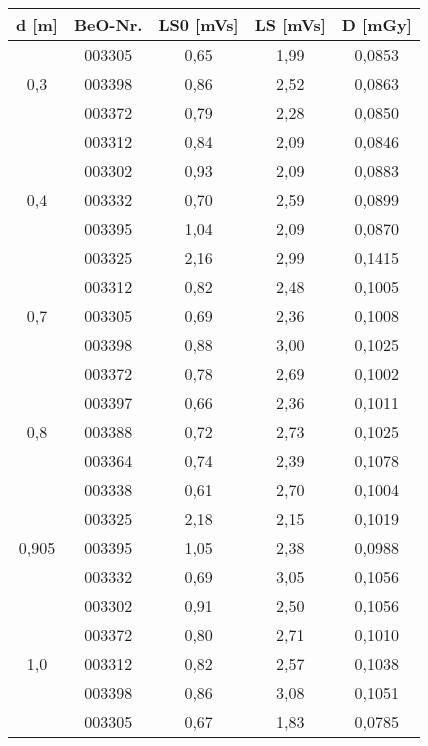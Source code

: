 	\begin{center}	
		\begin{tabular}{c|c|c|c|c}
					\textbf{d} [m] & BeO-Nr. & \textbf{LS0} [mVs] & \textbf{LS} [mVs] & \textbf{D} [mGy] \\
			\hline  
								& 003305 & 0,65 & 1,99 & 0,0853\\
						0,3		& 003398 & 0,86 & 2,52 & 0,0863\\
								& 003372 & 0,79 & 2,28 & 0,0850\\
								& 003312 & 0,84 & 2,09 & 0,0846\\
			\hline  
								& 003302 & 0,93 & 2,09 & 0,0883\\
						0,4		& 003332 & 0,70 & 2,59 & 0,0899\\
								& 003395 & 1,04 & 2,09 & 0,0870\\
								& 003325 & 2,16 & 2,99 & 0,1415\\
			\hline  
								& 003312 & 0,82 & 2,48 & 0,1005\\
						0,7		& 003305 & 0,69 & 2,36 & 0,1008\\
								& 003398 & 0,88 & 3,00 & 0,1025\\
								& 003372 & 0,78 & 2,69 & 0,1002\\
			\hline  
								& 003397 & 0,66 & 2,36 & 0,1011\\
						0,8		& 003388 & 0,72 & 2,73 & 0,1025\\
								& 003364 & 0,74 & 2,39 & 0,1078\\
								& 003338 & 0,61 & 2,70 & 0,1004\\
			\hline  
								& 003325 & 2,18 & 2,15 & 0,1019\\
						0,905   & 003395 & 1,05 & 2,38 & 0,0988\\
								& 003332 & 0,69 & 3,05 & 0,1056\\
								& 003302 & 0,91 & 2,50 & 0,1056\\
			\hline  
								& 003372 & 0,80 & 2,71 & 0,1010\\
						1,0		& 003312 & 0,82 & 2,57 & 0,1038\\
								& 003398 & 0,86 & 3,08 & 0,1051\\
								& 003305 & 0,67 & 1,83 & 0,0785\\
								
		\end{tabular}
	\end{center}

